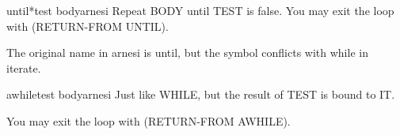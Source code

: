 \begin{macro}{until*}{test \body body}{arnesi}{}
  Repeat BODY until TEST is false. You may exit the loop with
  (RETURN-FROM UNTIL).
  \begin{devnote}
    The original name in arnesi is until, but the symbol conflicts
    with while in iterate.
  \end{devnote}
\end{macro}

\begin{macro}{awhile}{test \body body}{arnesi}{}
  Just like WHILE, but the result of TEST is bound to IT.

You may exit the loop with (RETURN-FROM AWHILE).
\end{macro}
